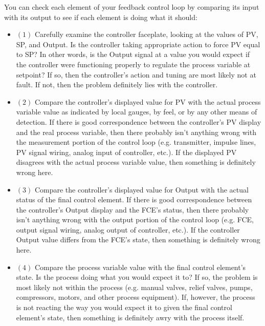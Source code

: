 \noindent
You can check each element of your feedback control loop by comparing its input with its output to see if each element is doing what it should:

\begin{itemize}
\item{$(1)$}  Carefully examine the controller faceplate, looking at the values of PV, SP, and Output.  Is the controller taking appropriate action to force PV equal to SP?  In other words, is the Output signal at a value you would expect if the controller were functioning properly to regulate the process variable at setpoint?  If so, then the controller's action and tuning are most likely not at fault.  If not, then the problem definitely lies with the controller.
\item{$(2)$}  Compare the controller's displayed value for PV with the actual process variable value as indicated by local gauges, by feel, or by any other means of detection.  If there is good correspondence between the controller's PV display and the real process variable, then there probably isn't anything wrong with the measurement portion of the control loop (e.g. transmitter, impulse lines, PV signal wiring, analog input of controller, etc.).  If the displayed PV disagrees with the actual process variable value, then something is definitely wrong here.
\item{$(3)$}  Compare the controller's displayed value for Output with the actual status of the final control element.  If there is good correspondence between the controller's Output display and the FCE's status, then there probably isn't anything wrong with the output portion of the control loop (e.g. FCE, output signal wiring, analog output of controller, etc.).  If the controller Output value differs from the FCE's state, then something is definitely wrong here.
\item{$(4)$}  Compare the process variable value with the final control element's state.  Is the process doing what you would expect it to?  If so, the problem is most likely not within the process (e.g. manual valves, relief valves, pumps, compressors, motors, and other process equipment).  If, however, the process is not reacting the way you would expect it to given the final control element's state, then something is definitely awry with the process itself.
\end{itemize}






